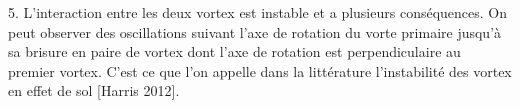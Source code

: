 \documentclass[french, 10pt]{article}
\begin{document}
5. L'interaction entre les deux vortex est instable et a plusieurs conséquences. On peut observer des oscillations suivant l'axe de rotation du vorte primaire jusqu'à sa brisure en paire de vortex dont l'axe de rotation est perpendiculaire au premier vortex. C'est ce que l'on appelle dans la littérature l'instabilité des vortex en effet de sol [Harris 2012].%








\end{document}
